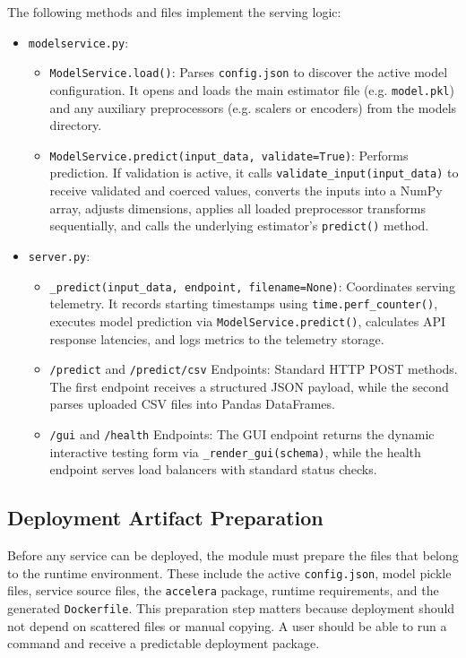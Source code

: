 \documentclass[12pt,a4paper,oneside]{report}
\newcommand{\modulepath}[1]{\texttt{#1}}
\begin{document}
\noindent The following methods and files implement the serving logic:
\begin{itemize}[leftmargin=*]
  \item \modulepath{modelservice.py}:
    \begin{itemize}
      \item \texttt{ModelService.load()}: Parses \texttt{config.json} to discover the active model configuration. It opens and loads the main estimator file (e.g. \texttt{model.pkl}) and any auxiliary preprocessors (e.g. scalers or encoders) from the models directory.
      \item \texttt{ModelService.predict(input\_data, validate=True)}: Performs prediction. If validation is active, it calls \texttt{validate\_input(input\_data)} to receive validated and coerced values, converts the inputs into a NumPy array, adjusts dimensions, applies all loaded preprocessor transforms sequentially, and calls the underlying estimator's \texttt{predict()} method.
    \end{itemize}
  \item \modulepath{server.py}:
    \begin{itemize}
      \item \texttt{\_predict(input\_data, endpoint, filename=None)}: Coordinates serving telemetry. It records starting timestamps using \texttt{time.perf\_counter()}, executes model prediction via \texttt{ModelService.predict()}, calculates API response latencies, and logs metrics to the telemetry storage.
      \item \texttt{/predict} and \texttt{/predict/csv} Endpoints: Standard HTTP POST methods. The first endpoint receives a structured JSON payload, while the second parses uploaded CSV files into Pandas DataFrames.
      \item \texttt{/gui} and \texttt{/health} Endpoints: The GUI endpoint returns the dynamic interactive testing form via \texttt{\_render\_gui(schema)}, while the health endpoint serves load balancers with standard status checks.
    \end{itemize}
\end{itemize}

\subsection{Deployment Artifact Preparation}
\noindent Before any service can be deployed, the module must prepare the files that belong to the runtime environment. These include the active \texttt{config.json}, model pickle files, service source files, the \texttt{accelera} package, runtime requirements, and the generated \texttt{Dockerfile}. This preparation step matters because deployment should not depend on scattered files or manual copying. A user should be able to run a command and receive a predictable deployment package.
\end{document}

